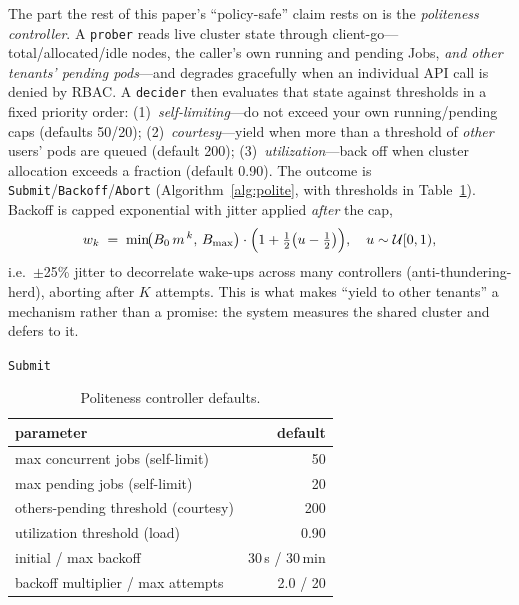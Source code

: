 \documentclass[conference]{IEEEtran}
\begin{document}
The part the rest of this paper's ``policy-safe'' claim rests on is the \emph{politeness
controller}. A \texttt{prober} reads live cluster state through client-go---total/allocated/idle
nodes, the caller's own running and pending Jobs, \emph{and other tenants' pending pods}---and
degrades gracefully when an individual API call is denied by RBAC. A \texttt{decider} then
evaluates that state against thresholds in a fixed priority order: (1)~\emph{self-limiting}---do
not exceed your own running/pending caps (defaults 50/20); (2)~\emph{courtesy}---yield when more
than a threshold of \emph{other} users' pods are queued (default 200); (3)~\emph{utilization}---back
off when cluster allocation exceeds a fraction (default 0.90). The outcome is
\texttt{Submit}/\texttt{Backoff}/\texttt{Abort} (Algorithm~\ref{alg:polite}, with thresholds in
Table~\ref{tab:cfg}). Backoff is capped exponential with jitter applied \emph{after} the cap,
\begin{equation}
w_k \;=\; \min\!\bigl(B_0\,m^{\,k},\,B_{\max}\bigr)\cdot\Bigl(1 + \tfrac12\bigl(u-\tfrac12\bigr)\Bigr),
\quad u\sim\mathcal U[0,1),
\end{equation}
i.e.\ $\pm$25\% jitter to decorrelate wake-ups across many controllers (anti-thundering-herd),
aborting after $K$ attempts. This is what makes ``yield to other tenants'' a mechanism rather than
a promise: the system measures the shared cluster and defers to it.

\begin{algorithm}[t]
\caption{Polite admission decision}\label{alg:polite}
\Return \texttt{Submit}\;
\end{algorithm}

\begin{table}[t]\centering\caption{Politeness controller defaults.}\label{tab:cfg}
\begin{tabular}{lr}\toprule
parameter & default \\\midrule
max concurrent jobs (self-limit) & 50 \\
max pending jobs (self-limit) & 20 \\
others-pending threshold (courtesy) & 200 \\
utilization threshold (load) & 0.90 \\
initial / max backoff & 30\,s / 30\,min \\
backoff multiplier / max attempts & 2.0 / 20 \\\bottomrule
\end{tabular}
\end{table}
\end{document}
